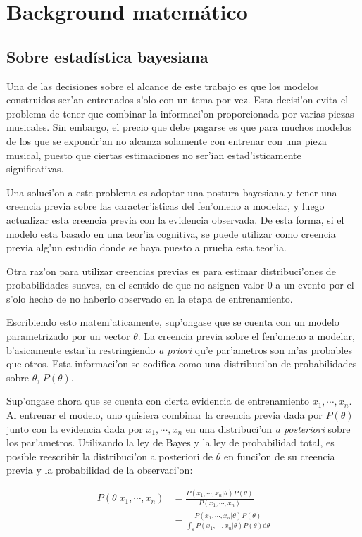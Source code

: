 \section{Background matem\'atico}
\label{sec:math_bg}
\subsection{Sobre estad\'istica bayesiana}
Una de las decisiones sobre el alcance de este trabajo es que los modelos construidos ser'an entrenados s'olo con un tema por vez. 
Esta decisi'on evita el problema de tener que combinar la informaci'on proporcionada por varias piezas musicales. Sin embargo, el precio que debe pagarse 
es que para muchos modelos de los que se expondr'an no alcanza solamente con entrenar con una pieza musical, puesto que ciertas estimaciones no ser'ian estad'isticamente 
significativas. 

Una soluci'on a este problema es adoptar una postura bayesiana y tener una creencia previa sobre las caracter'isticas del fen'omeno a modelar, 
y luego actualizar esta creencia previa con la evidencia observada. De esta forma, si el modelo esta basado en una teor'ia cognitiva, se puede utilizar
como creencia previa alg'un estudio donde se haya puesto a prueba esta teor'ia. 

Otra raz'on para utilizar creencias previas es para estimar distribuci'ones de probabilidades suaves, en el sentido de que no asignen valor $0$ a un evento 
por el s'olo hecho de no haberlo observado en la etapa de entrenamiento. 

Escribiendo esto matem'aticamente, sup'ongase que se cuenta con un mo\-delo parametrizado por un vector $\theta$. 
La creencia previa sobre el fen'omeno a modelar, b'asicamente estar'ia restringiendo \emph{a priori} qu'e par'ametros son m'as probables que otros. 
Esta informaci'on se codifica como una distribuci'on de probabilidades sobre $\theta$, $P(\theta)$. 

Sup'ongase ahora que se cuenta con cierta evidencia de entrenamiento $x_1,\cdots,x_n$. Al entrenar el modelo, uno quisiera combinar la 
creencia previa dada por $P(\theta)$ junto con la evidencia dada por $x_1,\cdots,x_n$ en una distribuci'on \emph{a posteriori} sobre los par'ametros.
Utilizando la ley de Bayes y la ley de probabilidad total, es posible reescribir la distribuci'on a posteriori de $\theta$ en funci'on de su creencia previa y 
la probabilidad de la observaci'on:

\begin{align*}
P(\theta|x_1,\cdots,x_n) &= \frac{P(x_1,\cdots,x_n|\theta) P(\theta)}{P(x_1,\cdots,x_n)} \\
                         &= \frac{P(x_1,\cdots,x_n|\theta) P(\theta)}{\int_\theta{P(x_1,\cdots,x_n|\theta)P(\theta)\mathrm{d}\theta}}
\end{align*}

